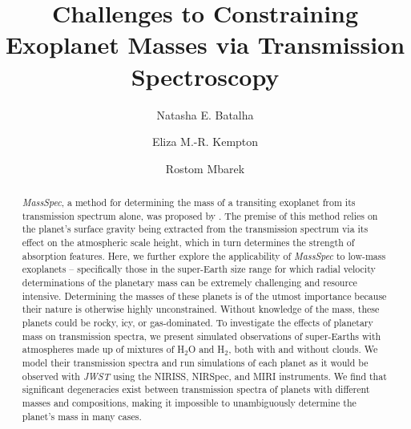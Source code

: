 \documentclass[iop]{emulateapj}
\begin{document}
\title{Challenges to Constraining Exoplanet Masses via Transmission Spectroscopy}

\author{Natasha E. Batalha}



\author{Eliza M.-R. Kempton}


\author{Rostom Mbarek}



\begin{abstract}
\textit{MassSpec}, a method for determining the mass of a transiting exoplanet from its transmission spectrum alone, was proposed by \citet{dew13}.  The premise of this method relies on the planet's surface gravity being extracted from the transmission spectrum via its effect on the atmospheric scale height, which in turn determines the strength of absorption features.  Here, we further explore the applicability of \textit{MassSpec} to low-mass exoplanets -- specifically those in the super-Earth size range for which radial velocity determinations of the planetary mass can be extremely challenging and resource intensive.  Determining the masses of these planets is of the utmost importance because their nature is otherwise highly unconstrained.  Without knowledge of the mass, these planets could be rocky, icy, or gas-dominated.  To investigate the effects of planetary mass on transmission spectra, we present simulated observations of super-Earths with atmospheres made up of mixtures of H$_2$O and H$_2$, both with and without clouds.  We model their transmission spectra and run simulations of each planet as it would be observed with \textit{JWST} using the NIRISS, NIRSpec, and MIRI instruments.  We find that significant degeneracies exist between transmission spectra of planets with different masses and compositions, making it impossible to unambiguously determine the planet's mass in many cases.
\end{abstract}
\end{document}
